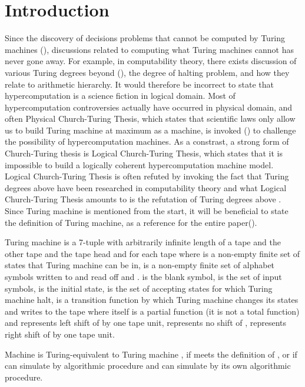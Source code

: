 \documentclass{roffin}
\begin{document}
\section{Introduction}
Since the discovery of decisions problems that cannot be computed by Turing machines (\cite{turing36}), discussions related to computing what Turing machines cannot has never gone away. For example, in computability theory, there exists discussion of various Turing degrees beyond (\cite{kleene54}), the degree of halting problem, and how they relate to arithmetic hierarchy. It would therefore be incorrect to state that hypercomputation is a science fiction in logical domain. Most of hypercomputation controversies actually have occurred in physical domain, and often Physical Church-Turing Thesis, which states that scientific laws only allow us to build Turing machine at maximum as a machine, is invoked (\cite{fitz06}) to challenge the possibility of hypercomputation machines. As a constrast, a strong form of Church-Turing thesis is Logical Church-Turing Thesis, which states that it is impossible to build a logically coherent hypercomputation machine model. Logical Church-Turing Thesis is often refuted by invoking the fact that Turing degrees above  have been researched in computability theory and what Logical Church-Turing Thesis amounts to is the refutation of Turing degrees above . Since Turing machine is mentioned from the start, it will be beneficial to state the definition of Turing machine, as a reference for the entire paper(\cite{hopcroft79}).
\begin{definition}
Turing machine is a 7-tuple  with arbitrarily infinite length of a tape  and the other tape  and the tape head  and  for each tape where  is a non-empty finite set of states that Turing machine can be in,  is a non-empty finite set of alphabet symbols written to and read off  and .  is the blank symbol,  is the set of input symbols,  is the initial state,  is the set of accepting states for which Turing machine halt,  is a transition function by which Turing machine changes its states and writes to the tape where  itself is a partial function (it is not a total function) and  represents left shift of  by one tape unit,  represents no shift of ,  represents right shift of  by one tape unit.  
\end{definition}
\begin{definition}
Machine  is Turing-equivalent to Turing machine , if  meets the definition of , or if  can simulate  by algorithmic procedure and  can simulate  by its own algorithmic procedure.
\end{definition}
\end{document}
